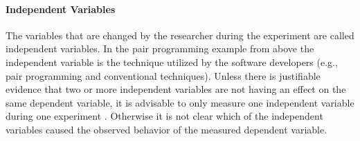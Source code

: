\paragraph{Independent Variables}

The variables that are changed by the researcher during the experiment are called independent variables. In the pair programming example from above  the independent variable is the technique utilized by the software developers (e.g., pair programming and conventional techniques). Unless there is justifiable evidence that two or more independent variables are not having an effect on the same dependent variable, it is advisable to only measure one independent variable during one experiment \cite{BuddiesVariables}. Otherwise it is not clear which of the independent variables caused the observed behavior of the measured dependent variable. 